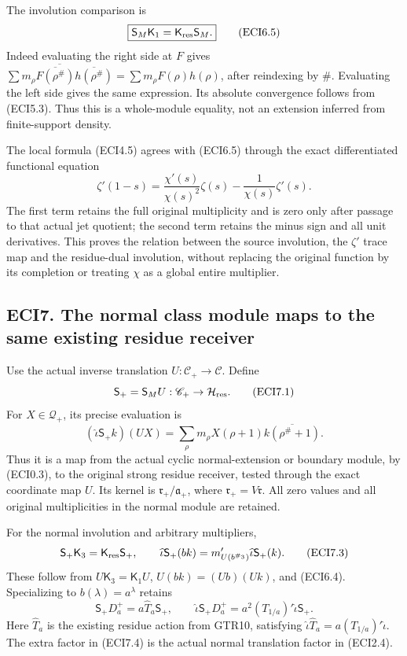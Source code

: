The involution comparison is \[
\boxed{\mathsf S_M\mathsf K_1=\mathsf K_{\rm res}\mathsf S_M.}
\tag{ECI6.5}
\] Indeed evaluating the right side at \(F\) gives
\(\overline{\sum m_\rho\overline{F(\rho^\#)}\overline{h(\rho^\#)}}
=\sum m_\rho F(\rho)h(\rho)\), after reindexing by \(\#\). Evaluating
the left side gives the same expression. Its absolute convergence
follows from (ECI5.3). Thus this is a whole-module equality, not an
extension inferred from finite-support density.

The local formula (ECI4.5) agrees with (ECI6.5) through the exact
differentiated functional equation \[
\zeta'(1-s)=\frac{\chi'(s)}{\chi(s)^2}\zeta(s)
-\frac{1}{\chi(s)}\zeta'(s).
\tag{ECI6.6}
\] The first term retains the full original multiplicity and is zero
only after passage to that actual jet quotient; the second term retains
the minus sign and all unit derivatives. This proves the relation
between the source involution, the \(\zeta'\) trace map and the
residue-dual involution, without replacing the original function by its
completion or treating \(\chi\) as a global entire multiplier.

\subsection{ECI7. The normal class module maps to the same existing
residue
receiver}\label{eci7.-the-normal-class-module-maps-to-the-same-existing-residue-receiver}

Use the actual inverse translation \(U:\mathscr C_+\to\mathscr C\).
Define \[
\mathsf S_+=\mathsf S_MU:\mathscr C_+\to\mathcal H_{\rm res}.
\tag{ECI7.1}
\] For \(X\in\mathcal Q_+\), its precise evaluation is \[
(\widehat\iota\mathsf S_+k)(UX)
=\sum_\rho m_\rho X(\rho+1)\overline{k(\rho^\#+1)}.
\tag{ECI7.2}
\] Thus it is a map from the actual cyclic normal-extension or boundary
module, by (ECI0.3), to the original strong residue receiver, tested
through the exact coordinate map \(U\). Its kernel is
\(\mathfrak r_+/\mathfrak a_+\), where \(\mathfrak r_+=V\mathfrak r\).
All zero values and all original multiplicities in the normal module are
retained.

For the normal involution and arbitrary multipliers, \[
\mathsf S_+\mathsf K_3=\mathsf K_{\rm res}\mathsf S_+,
\qquad
\widehat\iota\mathsf S_+(bk)
=m_{U(b^{\#_3})}'\widehat\iota\mathsf S_+(k).
\tag{ECI7.3}
\] These follow from \(U\mathsf K_3=\mathsf K_1U\), \(U(bk)=(Ub)(Uk)\),
and (ECI6.4). Specializing to \(b(\lambda)=a^\lambda\) retains \[
\boxed{\mathsf S_+D_a^+=a\widehat T_a\mathsf S_+,
\qquad
\widehat\iota\mathsf S_+D_a^+
=a^2(T_{1/a})'\widehat\iota\mathsf S_+.}
\tag{ECI7.4}
\] Here \(\widehat T_a\) is the existing residue action from GTR10,
satisfying \(\widehat\iota\widehat T_a=a(T_{1/a})'\widehat\iota\). The
extra factor in (ECI7.4) is the actual normal translation factor in
(ECI2.4).

